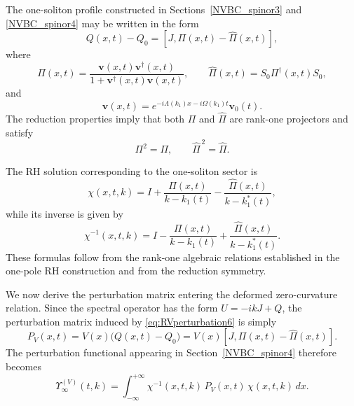 \documentclass[11pt]{amsart}
\theoremstyle{definition}
\numberwithin{equation}{section}
\begin{document}
The one-soliton profile constructed in Sections~\ref{NVBC_spinor3} and \ref{NVBC_spinor4} may be written in the form
\begin{equation}
Q(x,t)-Q_0=[J,\Pi(x,t)-\widehat\Pi(x,t)],
\label{eq:QPiRepresentation6}
\end{equation}
where
\begin{equation}
\Pi(x,t)=\frac{\mathbf v(x,t)\mathbf v^\dagger(x,t)}{1+\mathbf v^\dagger(x,t)\mathbf v(x,t)},
\qquad
\widehat\Pi(x,t)=S_0\Pi^\dagger(x,t)S_0,
\label{eq:PiHatPi6}
\end{equation}
and
\begin{equation}
\mathbf v(x,t)=e^{-i\Lambda(k_1)x-i\Omega(k_1)t}\mathbf v_0(t).
\label{eq:vSection6}
\end{equation}
The reduction properties imply that both $\Pi$ and $\widehat\Pi$ are rank-one projectors and satisfy
\begin{equation}
\Pi^2=\Pi,
\qquad
\widehat\Pi^{\,2}=\widehat\Pi.
\label{eq:projectorrelations6}
\end{equation}

The RH solution corresponding to the one-soliton sector is
\begin{equation}
\chi(x,t,k)=I+\frac{\Pi(x,t)}{k-k_1(t)}-\frac{\widehat\Pi(x,t)}{k-k_1^*(t)},
\label{eq:chiOneSoliton6}
\end{equation}
while its inverse is given by
\begin{equation}
\chi^{-1}(x,t,k)=I-\frac{\Pi(x,t)}{k-k_1(t)}+\frac{\widehat\Pi(x,t)}{k-k_1^*(t)}.
\label{eq:chiInverseOneSoliton6}
\end{equation}
These formulas follow from the rank-one algebraic relations established in the one-pole RH construction and from the reduction symmetry.

We now derive the perturbation matrix entering the deformed zero-curvature relation. Since the spectral operator has the form $U=-ikJ+Q$, the perturbation matrix induced by \eqref{eq:RVperturbation6} is simply
\begin{equation}
P_V(x,t)=V(x)\bigl(Q(x,t)-Q_0\bigr)
=
V(x)[J,\Pi(x,t)-\widehat\Pi(x,t)].
\label{eq:PVdef6}
\end{equation}
The perturbation functional appearing in Section~\ref{NVBC_spinor4} therefore becomes
\begin{equation}
\Upsilon_\infty^{(V)}(t,k)
=
\int_{-\infty}^{+\infty}
\chi^{-1}(x,t,k)\,
P_V(x,t)\,
\chi(x,t,k)\,dx.
\label{eq:UpsilonVdef6}
\end{equation}
\end{document}
